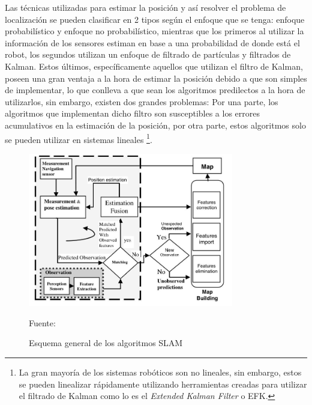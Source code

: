 Las técnicas utilizadas para estimar la posición y así resolver el problema de localización se pueden clasificar en 2 tipos según el enfoque que se tenga: enfoque probabilístico y enfoque no probabilístico, mientras que los primeros al utilizar la información de los sensores estiman en base a una probabilidad de donde está el robot, los segundos utilizan un enfoque de filtrado de partículas y filtrados de Kalman. Estos últimos, específicamente aquellos que utilizan el filtro de Kalman, poseen una gran ventaja a la hora de estimar la posición debido a que son simples de implementar, lo que conlleva a que sean los algoritmos predilectos a la hora de utilizarlos, sin embargo, existen dos grandes problemas: Por una parte, los algoritmos que implementan dicho filtro son susceptibles a los errores acumulativos en la estimación de la posición, por otra parte, estos algoritmos solo se pueden utilizar en sistemas lineales \footnote{La gran mayoría de los sistemas robóticos son no lineales, sin embargo, estos se pueden linealizar rápidamente utilizando herramientas creadas para utilizar el filtrado de Kalman como lo es el \textit{Extended Kalman Filter} o EFK.}. 

\begin{figure}[h]
    \centering
    \includegraphics[width=0.8\textwidth]{figures/02marco_conceptual/esquema_general_slam.JPG}
    \caption{\label{fig:esquema_slam} Esquema general de los algoritmos SLAM} 
    Fuente: \cite{john_sonar_1992}
\end{figure}

